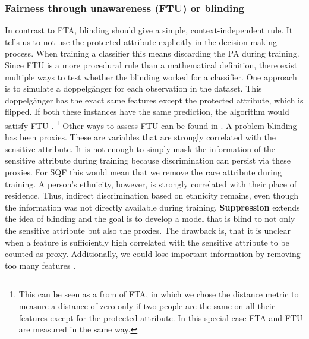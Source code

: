 \subsubsection*{Fairness through unawareness (FTU) or blinding}
In contrast to FTA, blinding should give a simple, context-independent rule. It tells us to not use the protected attribute explicitly in the decision-making process. When training a classifier this means discarding the PA during training.
Since FTU is a more procedural rule than a mathematical definition, there exist multiple ways to test whether the blinding worked for a classifier. One approach is to simulate a doppelgänger for each observation in the dataset. This doppelgänger has the exact same features except the protected attribute, which is flipped.
If both these instances have the same prediction, the algorithm would satisfy FTU \cite{verma2018}. \footnote{This can be seen as a from of FTA, in which we chose the distance metric to measure a distance of zero only if two people are the same on all their features except for the protected attribute. In this special case FTA and FTU are measured in the same way.} Other ways to assess FTU can be found in \cite{verma2018}. 
A problem blinding has been proxies. These are variables that are strongly correlated with the sensitive attribute. It is not enough to simply mask the information of the sensitive attribute during training because discrimination can persist via these proxies.
For SQF this would mean that we remove the race attribute during training.
A person's ethnicity, however, is strongly correlated with their place of residence. Thus, indirect discrimination based on ethnicity remains, even though the information was not directly available during training. \textbf{Suppression} extends the idea of blinding and the goal is to develop a model that is blind to not only the sensitive attribute but also the proxies. The drawback is, that it is unclear when a feature is sufficiently high correlated with the sensitive attribute to be counted as proxy. Additionally, we could lose important information by removing too many features \cite{castelnovo2022}.


